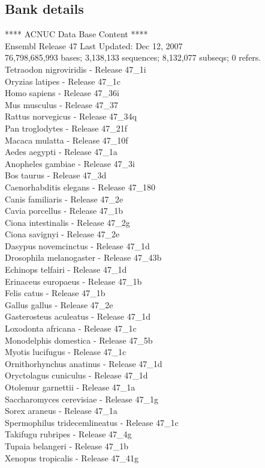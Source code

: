\documentclass{article}
\begin{document}
\begin{Schunk}
\subsection{Bank details}
             ****     ACNUC Data Base Content      ****\\
Ensembl Release 47	     		 Last Updated: Dec 12, 2007\\
76,798,685,993 bases; 3,138,133 sequences; 8,132,077 subseqs; 0 refers.\\
 Tetraodon nigroviridis - Release 47\_1i \\
 Oryzias latipes - Release 47\_1c \\
 Homo sapiens - Release 47\_36i \\
 Mus musculus - Release 47\_37 \\
 Rattus norvegicus - Release 47\_34q \\
 Pan troglodytes - Release 47\_21f \\
 Macaca mulatta - Release 47\_10f \\
 Aedes aegypti - Release 47\_1a \\
 Anopheles gambiae - Release 47\_3i \\
 Bos taurus - Release 47\_3d \\
 Caenorhabditis elegans - Release 47\_180 \\
 Canis familiaris - Release 47\_2e \\
 Cavia porcellus - Release 47\_1b \\
 Ciona intestinalis - Release 47\_2g \\
 Ciona savignyi - Release 47\_2e \\
 Dasypus novemcinctus - Release 47\_1d \\
 Drosophila melanogaster - Release 47\_43b \\
 Echinops telfairi - Release 47\_1d \\
 Erinaceus europaeus - Release 47\_1b \\
 Felis catus - Release 47\_1b \\
 Gallus gallus - Release 47\_2e \\
 Gasterosteus aculeatus - Release 47\_1d \\
 Loxodonta africana - Release 47\_1c \\
 Monodelphis domestica - Release 47\_5b \\
 Myotis lucifugus - Release 47\_1c \\
 Ornithorhynchus anatinus - Release 47\_1d \\
 Oryctolagus cuniculus - Release 47\_1d \\
 Otolemur garnettii - Release 47\_1a \\
 Saccharomyces cerevisiae - Release 47\_1g \\
 Sorex araneus - Release 47\_1a \\
 Spermophilus tridecemlineatus - Release 47\_1c \\
 Takifugu rubripes - Release 47\_4g \\
 Tupaia belangeri - Release 47\_1b \\
 Xenopus tropicalis - Release 47\_41g 


\end{Schunk}
\end{document}
